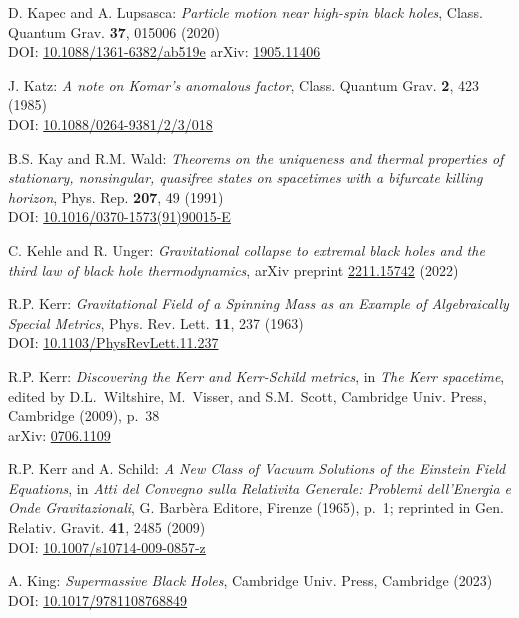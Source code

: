 \begin{thebibliography}{123}
D. Kapec and A. Lupsasca:
{\em Particle motion near high-spin black holes},
Class. Quantum Grav. {\bf 37}, 015006 (2020)\\
DOI: \href{https://doi.org/10.1088/1361-6382/ab519e}{10.1088/1361-6382/ab519e}\hfill
arXiv: \href{https://arxiv.org/abs/1905.11406}{1905.11406}

J. Katz:
{\em A note on Komar's anomalous factor},
Class. Quantum Grav. {\bf 2}, 423 (1985)\\
DOI: \href{https://doi.org/10.1088/0264-9381/2/3/018}{10.1088/0264-9381/2/3/018}

B.S. Kay and R.M. Wald:
{\em Theorems on the uniqueness and thermal properties of stationary, nonsingular, quasifree states on spacetimes with a bifurcate killing horizon},
Phys. Rep. {\bf 207}, 49 (1991)\\
DOI: \href{https://doi.org/10.1016/0370-1573(91)90015-E}{10.1016/0370-1573(91)90015-E}

C. Kehle and R. Unger:
{\em Gravitational collapse to extremal black holes and the third law of black hole thermodynamics},
arXiv preprint \href{https://arxiv.org/abs/2211.15742}{2211.15742} (2022)

R.P. Kerr:
{\em Gravitational Field of a Spinning Mass as an Example of Algebraically Special Metrics},
Phys. Rev. Lett. {\bf 11}, 237 (1963)\\
DOI: \href{https://doi.org/10.1103/PhysRevLett.11.237}{10.1103/PhysRevLett.11.237}

R.P. Kerr: {\em Discovering the Kerr and Kerr-Schild metrics},
in {\em The Kerr spacetime}, edited by D.L.~Wiltshire, M.~Visser, and S.M.~Scott,
Cambridge Univ. Press, Cambridge (2009), p.~38\\
arXiv: \href{https://arxiv.org/abs/0706.1109}{0706.1109}

R.P. Kerr and A. Schild:
{\em A New Class of Vacuum Solutions of the Einstein Field Equations},
in {\em Atti del Convegno sulla Relativita Generale: Problemi
dell’Energia e Onde Gravitazionali}, G. Barbèra Editore,
Firenze (1965), p.~1; reprinted in
Gen. Relativ. Gravit. {\bf 41}, 2485 (2009)\\
DOI: \href{https://doi.org/10.1007/s10714-009-0857-z}{10.1007/s10714-009-0857-z}

A. King:
{\em Supermassive Black Holes},
Cambridge Univ. Press, Cambridge (2023)\\
DOI: \href{https://doi.org/10.1017/9781108768849}{10.1017/9781108768849}


\end{thebibliography}
